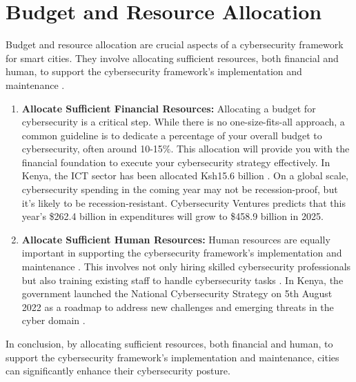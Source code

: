 \documentclass{article}
\begin{document}
\section{Budget and Resource Allocation}
Budget and resource allocation are crucial aspects of a cybersecurity framework for smart cities. They involve allocating sufficient resources, both financial and human, to support the cybersecurity framework’s implementation and maintenance \cite{opurum-2022}\cite{roohparvar-2023}\cite{leidwinger-no-date}.
\begin{enumerate}[label=\alph*)]

    \item \textbf{Allocate Sufficient Financial Resources:} Allocating a budget for cybersecurity is a critical step. While there is no one-size-fits-all approach, a common guideline is to dedicate a percentage of your overall budget to cybersecurity, often around 10-15\%\cite{roohparvar-2023}. This allocation will provide you with the financial foundation to execute your cybersecurity strategy effectively\cite{roohparvar-2023}. In Kenya, the ICT sector has been allocated Ksh15.6 billion \cite{muli-2022}. On a global scale, cybersecurity spending in the coming year may not be recession-proof, but it’s likely to be recession-resistant\cite{mello-2022}. Cybersecurity Ventures predicts that this year’s \$262.4 billion in expenditures will grow to \$458.9 billion in 2025\cite{freeze-2021}.
    
    \item \textbf{Allocate Sufficient Human Resources:} Human resources are equally important in supporting the cybersecurity framework’s implementation and maintenance \cite{opurum-2022}\cite{roohparvar-2023}\cite{leidwinger-no-date}. This involves not only hiring skilled cybersecurity professionals but also training existing staff to handle cybersecurity tasks \cite{opurum-2022}\cite{roohparvar-2023}\cite{leidwinger-no-date}. In Kenya, the government launched the National Cybersecurity Strategy on 5th August 2022 as a roadmap to address new challenges and emerging threats in the cyber domain \cite{national-computer-and-cybercrimes-coordination-committee-no-date}.

\end{enumerate}
In conclusion, by allocating sufficient resources, both financial and human, to support the cybersecurity framework’s implementation and maintenance, cities can significantly enhance their cybersecurity posture\cite{opurum-2022}\cite{roohparvar-2023}\cite{leidwinger-no-date}.
\end{document}
